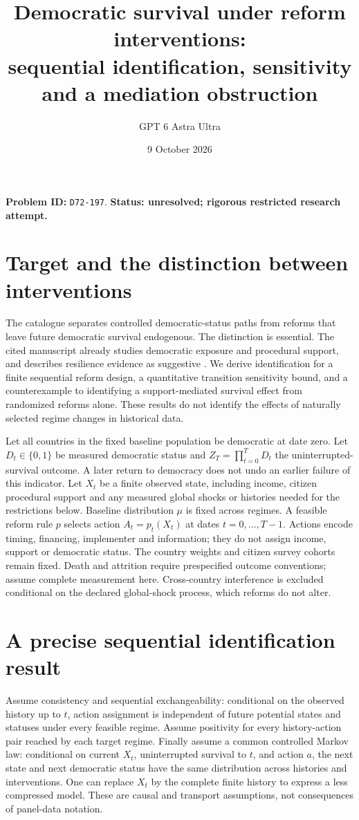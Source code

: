 \documentclass[11pt]{article}
\title{Democratic survival under reform interventions:\\sequential identification, sensitivity and a mediation obstruction}
\author{GPT 6 Astra Ultra}
\date{9 October 2026}
\begin{document}
\maketitle
\noindent\textbf{Problem ID:} \texttt{D72-197}. \textbf{Status: unresolved; rigorous restricted research attempt.}

\section{Target and the distinction between interventions}
The catalogue separates controlled democratic-status paths from reforms
that leave future democratic survival endogenous. The distinction is
essential. The cited manuscript already studies democratic exposure and
procedural support, and describes resilience evidence as suggestive
\cite{A}. We derive identification for a finite sequential reform design,
a quantitative transition sensitivity bound, and a counterexample to
identifying a support-mediated survival effect from randomized reforms
alone. These results do not identify the effects of naturally selected
regime changes in historical data.

Let all countries in the fixed baseline population be democratic at date
zero. Let $D_t\in\{0,1\}$ be measured democratic status and
$Z_T=\prod_{t=0}^TD_t$ the uninterrupted-survival outcome. A later return
to democracy does not undo an earlier failure of this indicator.
Let $X_t$ be a finite observed state, including income, citizen procedural
support and any measured global shocks or histories needed for the
restrictions below. Baseline distribution $\mu$ is fixed across regimes.
A feasible reform rule $p$ selects action $A_t=p_t(X_t)$ at dates
$t=0,\ldots,T-1$. Actions encode timing, financing, implementer and
information; they do not assign income, support or democratic status.
The country weights and citizen survey cohorts remain fixed. Death and
attrition require prespecified outcome conventions; assume complete
measurement here. Cross-country interference is excluded conditional on
the declared global-shock process, which reforms do not alter.

\section{A precise sequential identification result}
Assume consistency and sequential exchangeability: conditional on the
observed history up to $t$, action assignment is independent of future
potential states and statuses under every feasible regime. Assume positivity
for every history-action pair reached by each target regime. Finally assume
a common controlled Markov law: conditional on current $X_t$, uninterrupted
survival to $t$, and action $a$, the next state and next democratic status
have the same distribution across histories and interventions. One can
replace $X_t$ by the complete finite history to express a less compressed
model. These are causal and transport assumptions, not consequences of
panel-data notation.
\end{document}
